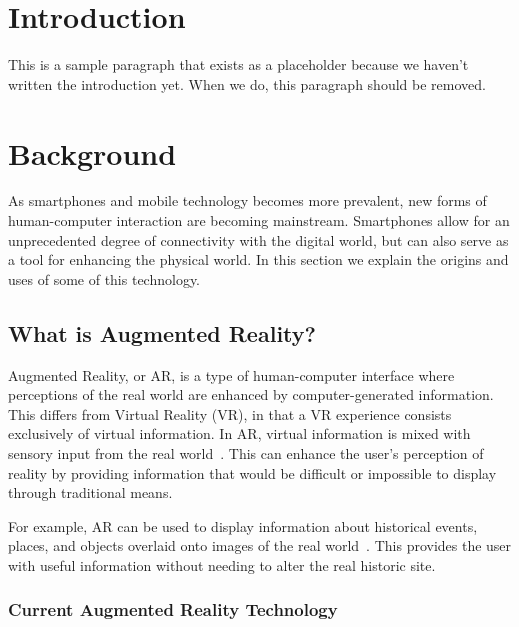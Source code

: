 \documentclass[a4paper, 10pt, american, titlepage]{article}
\begin{document}

\section{Introduction}
\label{sec:introduction}

This is a sample paragraph that exists as a placeholder because
we haven't written the introduction yet. When we do, this paragraph should be
removed.

\section{Background}
\label{sec:background}

As smartphones and mobile technology becomes more prevalent,
new forms of human-computer interaction are becoming mainstream. Smartphones
allow for an unprecedented degree of connectivity with the digital world, but
can also serve as a tool for enhancing the physical world. In this section we
explain the origins and uses of some of this technology.

\subsection{What is Augmented Reality?}
\label{sec:whatIsAugmentedReality}

Augmented Reality, or AR, is a type of human-computer interface where
perceptions of the real world are enhanced by computer-generated information.
This differs from Virtual Reality (VR), in that a VR experience consists
exclusively of virtual information. In AR, virtual information is mixed with
sensory input from the real world~\autocite{carmigniani2011}. This can enhance
the user's perception of reality by providing information that would be
difficult or impossible to display through traditional means.

For example, AR can be used to display information about historical events,
places, and objects overlaid onto images of the real world~\autocite{saenz2009}.
This provides the user with useful information without needing to alter the real
historic site.

\subsubsection{Current Augmented Reality Technology}
\label{sec:currentAugmentedRealityTechnology}
\end{document}
